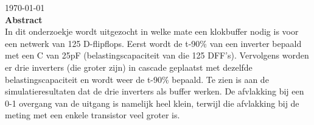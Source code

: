 \begin{titlepage}


{\large \today}\\[3cm] %


 
% 

\textbf{Abstract} \\
In dit onderzoekje wordt uitgezocht in welke mate een klokbuffer nodig is voor een netwerk van 125 D-flipflops. Eerst wordt de t-90\% van een inverter bepaald met een C van 25pF (belastingscapaciteit van die 125 DFF's). Vervolgens worden er drie inverters (die groter zijn)  in cascade geplaatst met dezelfde belastingscapaciteit en wordt weer de t-90\% bepaald. Te zien is aan de simulatieresultaten dat de drie inverters als buffer werken. De afvlakking bij een 0-1 overgang van de uitgang is namelijk heel klein, terwijl die afvlakking bij de meting met een enkele transistor veel groter is. 

\vfill %

\end{titlepage}
